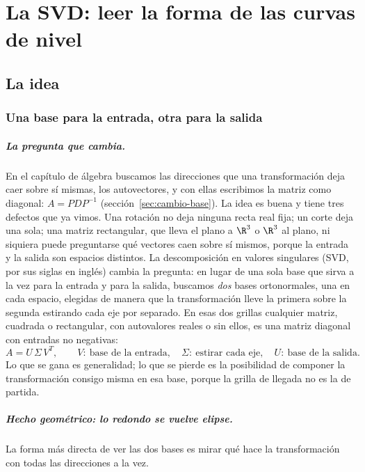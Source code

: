 \chapter{La SVD: leer la forma de las curvas de nivel}\label{cap:svd}

\section{La idea}



\subsection{Una base para la entrada, otra para la salida}\label{sec:svd-idea}

\paragraph{La pregunta que cambia.} En el capítulo de álgebra buscamos las direcciones que
una transformación deja caer sobre sí mismas, los autovectores, y con ellas escribimos la
matriz como diagonal: \(A=PDP^{-1}\) (sección~\ref{sec:cambio-base}). La idea es buena y
tiene tres defectos que ya vimos. Una rotación no deja ninguna recta real fija; un corte deja
una sola; una matriz rectangular, que lleva el plano a \(\R^3\) o \(\R^3\) al plano, ni
siquiera puede preguntarse qué vectores caen sobre sí mismos, porque la entrada y la salida
son espacios distintos. La descomposición en valores singulares (SVD, por sus siglas en
inglés) cambia la pregunta: en lugar de una sola base que sirva a la vez para la entrada y
para la salida, buscamos \emph{dos} bases ortonormales, una en cada espacio, elegidas de
manera que la transformación lleve la primera sobre la segunda estirando cada eje por
separado. En esas dos grillas cualquier matriz, cuadrada o rectangular, con autovalores
reales o sin ellos, es una matriz diagonal con entradas no negativas:
\[
  A=U\,\Sigma\,V^T,\qquad
  V:\ \text{base de la entrada},\quad
  \Sigma:\ \text{estirar cada eje},\quad
  U:\ \text{base de la salida}.
\]
Lo que se gana es generalidad; lo que se pierde es la posibilidad de componer la
transformación consigo misma en esa base, porque la grilla de llegada no es la de partida.

\paragraph{Hecho geométrico: lo redondo se vuelve elipse.} La forma más directa de ver las
dos bases es mirar qué hace la transformación con todas las direcciones a la vez.

